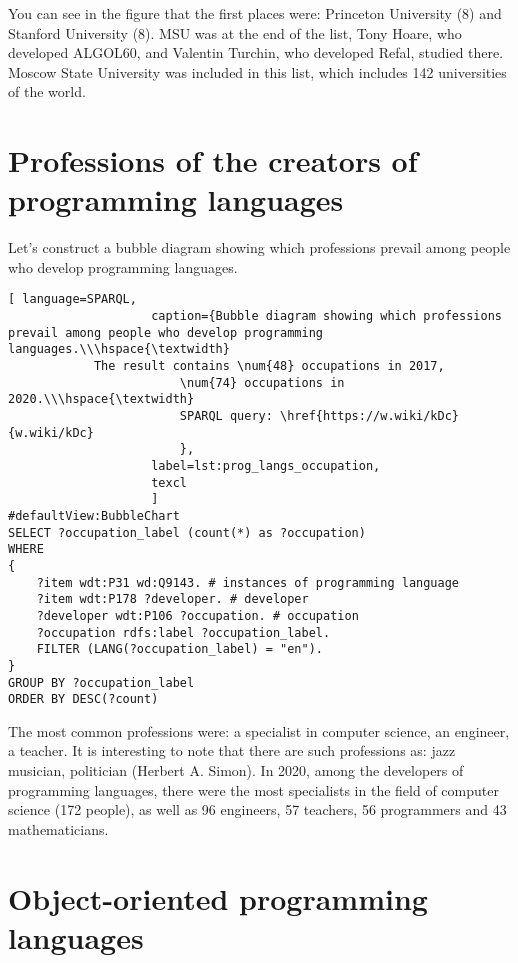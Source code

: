 You can see in the figure that the first places were: Princeton University (8) and Stanford University (8). MSU was at the end of the list, Tony Hoare, who developed ALGOL60, and Valentin Turchin, who developed Refal, studied there. Moscow State University was included in this list, which includes 142 universities of the world.

\section{Professions of the creators of programming languages}

Let's construct a bubble diagram showing which professions prevail among people who develop programming languages.

\begin{lstlisting}[ language=SPARQL, 
                    caption={Bubble diagram showing which professions prevail among people who develop programming languages.\\\hspace{\textwidth}
			The result contains \num{48} occupations in 2017, 
                        \num{74} occupations in 2020.\\\hspace{\textwidth}
                        SPARQL query: \href{https://w.wiki/kDc}{w.wiki/kDc}
                        },
                    label=lst:prog_langs_occupation,
                    texcl 
                    ]
#defaultView:BubbleChart
SELECT ?occupation_label (count(*) as ?occupation)
WHERE
{
    ?item wdt:P31 wd:Q9143. # instances of programming language 
    ?item wdt:P178 ?developer. # developer
    ?developer wdt:P106 ?occupation. # occupation
    ?occupation rdfs:label ?occupation_label. 
    FILTER (LANG(?occupation_label) = "en"). 
}
GROUP BY ?occupation_label 
ORDER BY DESC(?count)
\end{lstlisting}%

The most common professions were: a specialist in computer science, an engineer, a teacher. It is interesting to note that there are such professions as: jazz musician, politician (Herbert A. Simon). In 2020, among the developers of programming languages, there were the most specialists in the field of computer science (172 people), as well as 96 engineers, 57 teachers, 56 programmers and 43 mathematicians.

\section{Object-oriented programming languages}

